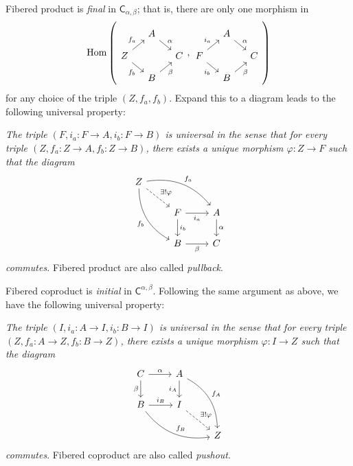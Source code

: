 \begin{sol}
Fibered product is \emph{final} in $\mathsf{C}_{\alpha, \beta}$; that is, there are only one morphism in 
\[
\Hom\left(
\begin{tikzcd}[column sep=small, row sep=small]
& A \arrow[rd, "\alpha"] &   \\
Z \arrow[ru, "f_a"] \arrow[rd, "f_b"'] &  & C \\
& B \arrow[ru, "\beta"'] &  
\end{tikzcd},
\begin{tikzcd}[column sep=small, row sep=small]
& A \arrow[rd, "\alpha"] &   \\
F \arrow[ru, "i_a"] \arrow[rd, "i_b"'] &  & C \\
& B \arrow[ru, "\beta"'] &  
\end{tikzcd}
\right)    
\]
for any choice of the triple $(Z,f_a,f_b)$. Expand this to a diagram leads to the following universal property:

\textit{
The triple $(F, i_a:F \to A, i_b:F \to B)$ is universal in the sense that for every triple $(Z,f_a:Z \to A,f_b:Z \to B)$, there exists a unique morphism $\varphi: Z \to F$ such that the diagram}
\[
\begin{tikzcd}
Z \arrow[rd, "\exists!\varphi", dashed] \arrow[rdd, "f_b"', bend right] \arrow[rrd, "f_a", bend left] & & \\
& F \arrow[d, "i_b"] \arrow[r, "i_a"'] & A \arrow[d, "\alpha"] \\
& B \arrow[r, "\beta"']  & C                    
\end{tikzcd}    
\]
\textit{commutes.} Fibered product are also called \emph{pullback}.

Fibered coproduct is \emph{initial} in $\mathsf{C}^{\alpha, \beta}$. Following the same argument as above, we have the following universal property:

\textit{
The triple $(I, i_a:A \to I, i_b:B \to I)$ is universal in the sense that for every triple $(Z,f_a:A \to Z,f_b:B \to Z)$, there exists a unique morphism $\varphi: I \to Z$ such that the diagram}
\[
\begin{tikzcd}
C \arrow[r, "\alpha"] \arrow[d, "\beta"']         & A \arrow[d, "i_A"'] \arrow[rdd, "f_A", bend left] &   \\
B \arrow[r, "i_B"] \arrow[rrd, "f_B", bend right] & I \arrow[rd, "\exists!\varphi", dashed]   &   \\
& & Z
\end{tikzcd}    
\]
\textit{commutes}. Fibered coproduct are also called \emph{pushout}.


\end{sol}
